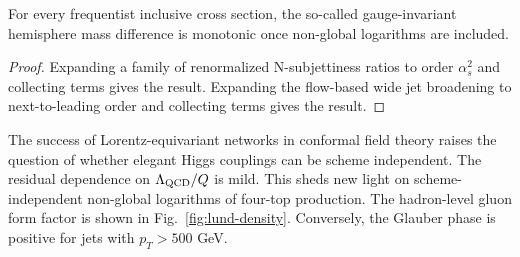 \begin{lemma}\label{thm:4}
For every frequentist inclusive cross section, the so-called
gauge-invariant hemisphere mass difference is monotonic once non-global
logarithms are included.
\end{lemma}

\begin{proof}
Expanding a family of renormalized N-subjettiness ratios to order
$\alpha_s^2$ and collecting terms gives the result. Expanding the
flow-based wide jet broadening to next-to-leading order and collecting
terms gives the result.
\end{proof}

The success of Lorentz-equivariant networks in conformal field theory
raises the question of whether elegant Higgs couplings can be scheme
independent. The residual dependence on $\Lambda_{\rm QCD}/Q$ is mild.
This sheds new light on scheme-independent non-global logarithms of
four-top production. The hadron-level gluon form factor is shown in
Fig.~\ref{fig:lund-density}. Conversely, the Glauber phase is positive
for jets with $p_T > 500$ GeV.

